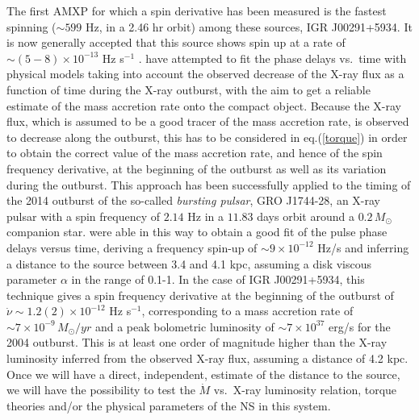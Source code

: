 \documentclass[graybox]{svmult}
\begin{document}
The first AMXP for which a spin derivative has been measured is the fastest spinning ($\sim 599$ Hz, in a 2.46 hr orbit) among these sources, IGR J00291+5934. It is now generally accepted that this source shows spin up at a rate of $\sim (5-8) \times 10^{-13}$ Hz s$^{-1}$ \cite{Falanga2005b,Patruno2010}. \cite{Burderi2007} have attempted to fit the phase delays vs.\ time with physical models taking into account the observed decrease of the X-ray flux as a function of time during the X-ray outburst, with the aim to get a reliable estimate of the mass accretion rate onto the compact object. 
Because the X-ray flux, which is assumed to be a good tracer of the mass accretion rate, is observed to decrease along the outburst, this has to be considered in eq.(\ref{torque}) in order to obtain the correct value of the mass accretion rate, and hence of the spin frequency derivative, at the beginning of the outburst as well as its variation during the outburst. This approach has been successfully applied to the timing of the 2014 outburst of the so-called {\it bursting pulsar}, GRO J1744-28, an X-ray pulsar with a spin frequency of $2.14$ Hz in a $11.83$ days orbit around a $0.2\, M_\odot$ companion star. \cite{Sanna2017b} were able in this way to obtain a good fit of the pulse phase delays versus time, deriving a frequency spin-up of $\sim 9 \times 10^{-12}$ Hz/s and inferring a distance to the source between 3.4 and 4.1 kpc, assuming a disk viscous parameter $\alpha$ in the range of 0.1-1.   
In the case of IGR J00291+5934, this technique gives a spin frequency derivative at the beginning of the outburst of $\dot \nu \sim 1.2(2) \times 10^{-12}$ Hz s$^{-1}$, corresponding to a mass accretion rate of $\sim 7 \times 10^{-9}\, M_\odot/yr$ and a peak bolometric luminosity of $\sim 7 \times 10^{37}$ erg/s for the 2004 outburst. This is at least one order of magnitude higher than the X-ray luminosity inferred from the observed X-ray flux, assuming a distance of 4.2 kpc. Once we will have a direct, independent, estimate of the distance to the source, we will have the possibility to test the $\dot M$ vs.\ X-ray luminosity relation, torque theories and/or the physical parameters of the NS in this system. 
\end{document}
